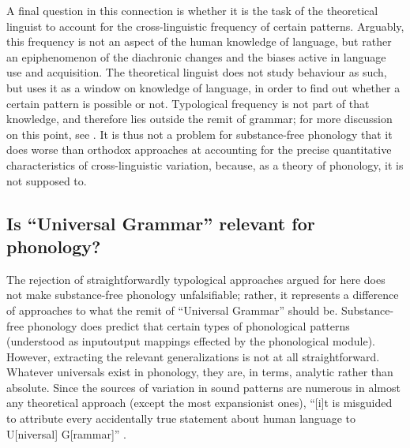 A final question in this connection is whether it is the task of the theoretical linguist to account for the cross\hyp linguistic frequency of certain patterns. Arguably, this frequency is not an aspect of the human knowledge of language, but rather an epiphenomenon of the diachronic changes and the biases active in language use and acquisition. The theoretical linguist does not study behaviour as such, but uses it as a window on knowledge of language, in order to find out whether a certain pattern is possible or not. Typological frequency is not part of that knowledge, and therefore lies outside the remit of grammar; for more discussion on this point, see \citet{newmeyer05:_possib,harris08,harris10:_explain}. It is thus not a problem for substance\hyp free phonology that it does worse than orthodox approaches at accounting for the precise quantitative characteristics of cross\hyp linguistic variation, because, as a theory of phonology, it is not supposed to.

\subsection{Is \enquote{Universal Grammar} relevant for phonology?}
\label{sec:enqu-gramm-relev}

The rejection of straightforwardly typological approaches argued for here does not make substance\hyp free phonology unfalsifiable; rather, it represents a difference of approaches to what the remit of \enquote{Universal Grammar} should be. Substance\hyp free phonology does predict that certain types of phonological patterns (understood as input\endash output mappings effected by the phonological module). However, extracting the relevant generalizations is not at all straightforward. Whatever universals exist in phonology, they are, in  terms, analytic rather than absolute. Since the sources of variation in sound patterns are numerous in almost any theoretical approach (except the most expansionist ones), \enquote{[i]t is misguided to attribute every accidentally true statement about human language to U[niversal] G[rammar]} \citep[p.~461]{odden88:_anti_ocp}.

